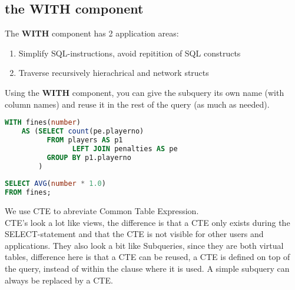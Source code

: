 \documentclass{report}
\begin{document}
	\subsection{the WITH component}
	The \textbf{WITH} component has 2 application areas: 
	\begin{enumerate}
		\item Simplify SQL-instructions, avoid repitition of SQL constructs
		\item Traverse recursively hierachrical and network structs
	\end{enumerate}
	Using the \textbf{WITH} component, you can give the subquery its own name (with column names) and reuse it in the rest of the query (as much as needed).
	\begin{lstlisting}[language=sql]
WITH fines(number)
	AS (SELECT count(pe.playerno)
		  FROM players AS p1
			 	LEFT JOIN penalties AS pe
		  GROUP BY p1.playerno
		)
		
SELECT AVG(number * 1.0)
FROM fines;	\end{lstlisting}
	We use CTE to abreviate Common Table Expression.
	\\
	CTE's look a lot like views, the difference is that a CTE only exists during the SELECT-statement and that the CTE is not visible for other users and applications. They also look a bit like Subqueries, since they are both virtual tables, difference here is that a CTE can be reused, a CTE is defined on top of the query, instead of within the clause where it is used. A simple subquery can always be replaced by a CTE.
	\pagebreak
\end{document}
